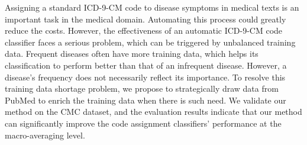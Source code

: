 Assigning a standard ICD-9-CM code to disease symptoms in medical texts is an important task in the medical domain. Automating this process could greatly reduce the costs. However, the effectiveness of an automatic ICD-9-CM code classifier faces a serious problem, which can be triggered by unbalanced training data. Frequent diseases often have more training data, which helps its classification to perform better than that of an infrequent disease. However, a disease's frequency does not necessarily reflect its importance. To resolve this training data shortage problem, we propose to strategically draw data from PubMed to enrich the training data when there is such need. We validate our method on the CMC dataset, and the evaluation results indicate that our method can significantly improve the code assignment classifiers' performance at the macro-averaging level.
